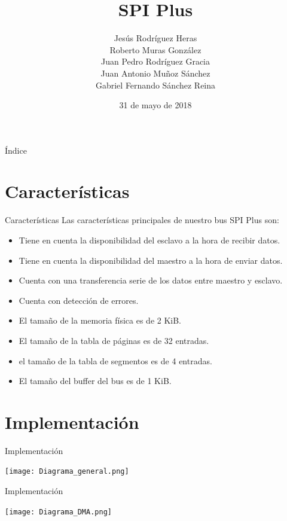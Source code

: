 \documentclass{beamer}
\title{SPI Plus}
\author{Jesús Rodríguez Heras \\ Roberto Muras González \\ Juan Pedro Rodríguez Gracia \\ Juan Antonio Muñoz Sánchez \\ Gabriel Fernando Sánchez Reina}
\date{31 de mayo de 2018}
\begin{document}
\begin{frame}
  \titlepage
  
\end{frame}

\begin{frame}{Índice}
  \tableofcontents
\end{frame}


\section{Características}
\begin{frame}{Características}
	Las características principales de nuestro bus SPI Plus son:
	\begin{itemize}
		\item Tiene en cuenta la disponibilidad del esclavo a la hora de recibir datos.
		\item Tiene en cuenta la disponibilidad del maestro a la hora de enviar datos.
		\item Cuenta con una transferencia serie de los datos entre maestro y esclavo.
		\item Cuenta con detección de errores.
		\item El tamaño de la memoria física es de 2 KiB.
		\item El tamaño de la tabla de páginas es de 32 entradas.
		\item el tamaño de la tabla de segmentos es de 4 entradas.
		\item El tamaño del buffer del bus es de 1 KiB.
	\end{itemize}
\end{frame}

\section{Implementación}
\begin{frame}{Implementación}
	\begin{center}
		\texttt{[image: Diagrama\_general.png]}
	\end{center}
\end{frame}

\begin{frame}{Implementación}
\begin{center}
	\texttt{[image: Diagrama\_DMA.png]}
\end{center}
\end{frame}
\end{document}
